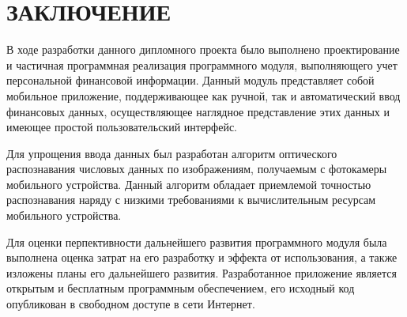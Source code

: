 \section*{ЗАКЛЮЧЕНИЕ}

В ходе разработки данного дипломного проекта было выполнено проектирование и
частичная программная реализация программного модуля,
выполняющего учет персональной финансовой информации.
Данный модуль представляет собой мобильное приложение,
поддерживающее как ручной, так и автоматический ввод
финансовых данных, осуществляющее наглядное представление этих данных
и имеющее простой пользовательский интерфейс.

Для упрощения ввода данных был разработан
алгоритм оптического распознавания числовых данных по изображениям,
получаемым с фотокамеры мобильного устройства.
Данный алгоритм обладает приемлемой точностью распознавания
наряду с низкими требованиями к
вычислительным ресурсам мобильного устройства.

Для оценки перпективности дальнейшего развития программного модуля
была выполнена оценка затрат на его разработку и эффекта от использования,
а также изложены планы его дальнейшего развития.
Разработанное приложение является открытым и бесплатным программным обеспечением,
его исходный код опубликован в свободном доступе в сети Интернет.